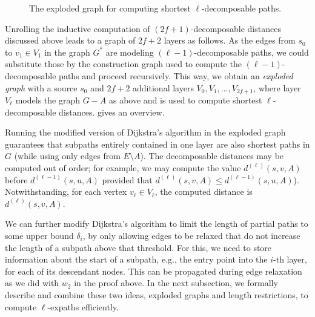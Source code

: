 \documentclass{article}\usepackage[a4paper,margin=20mm]{geometry}
\renewcommand{\le}{\leqslant}
\begin{document}
\begin{figure}[t]
  \caption{The exploded graph for computing shortest $\ell$-decomposable paths.}
  \label{fig:exploded graph}
\end{figure}

Unrolling the inductive computation of $(2f{+}1)$-decomposable distances
discussed above leads to a graph of $2f+2$ layers as follows.
As the edges from $s_0$ to $v_1 \in V_1$ in the graph $G^*$ are modeling $(\ell{-}1)$-decomposable paths,
we could substitute those by the construction graph used to compute the $(\ell{-}1)$-decomposable paths and proceed recursively.
This way, we obtain an \emph{exploded graph} with a source $s_0$ and $2f+2$ additional layers $V_0,V_1,\ldots,V_{2f+1}$, where layer $V_\ell$ models the graph $G-A$ as above 
and is used to compute shortest $\ell$-decomposable distances.
 gives an overview.

Running the modified version of Dijkstra's algorithm in the exploded graph guarantees that subpaths entirely contained in one layer are also shortest paths in $G$ (while using only edges from $E{\setminus}A$).
The decomposable distances may be computed out of order;
for example, we may compute the value $d^{(\ell)}(s,v,A)$ before $d^{(\ell-1)}(s,u,A)$ 
provided that $d^{(\ell)}(s,v,A) \le d^{(\ell-1)}(s,u,A)$).
Notwithstanding, for each vertex $v_\ell \in V_\ell$, the computed distance is $d^{(\ell)}(s,v,A)$.

We can further modify Dijkstra's algorithm to limit the length of partial paths to some upper bound $\delta_{i}$, by only allowing edges to be relaxed that do not increase the length of a subpath above that threshold.
For this, we need to store information about the start of a subpath,
e.g., the entry point into the $i$-th layer, for each of its descendant nodes.
This can be propagated during edge relaxation as we did with $w_2$ in the proof above.
In the next subsection, we formally describe and combine these two ideas,
exploded graphs and length restrictions, to compute $\ell$-expaths efficiently.
\end{document}

